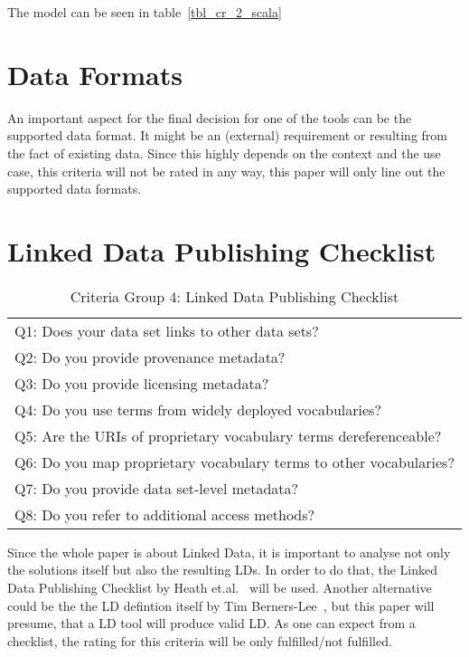 The model can be seen in table~\ref{tbl_cr_2_scala}

\section{Data Formats}

An important aspect for the final decision for one of the tools can be the supported data format. It might be an (external) requirement or resulting from the fact of existing data. Since this highly depends on the context and the use case, this criteria will not be rated in any way, this paper will only line out the supported data formats.

\section{Linked Data Publishing Checklist}

\begin{table}[htb]
\centering
\begin{tabular}{|l|}
\rowcolor[HTML]{EFEFEF} 
\hline
\multicolumn{1}{|c|}{\textbf{Criteria}}                        \\ \hline
Q1: Does your data set links to other data sets?                   \\ \hline
Q2: Do you provide provenance metadata?                            \\ \hline
Q3: Do you provide licensing metadata?                             \\ \hline
Q4: Do you use terms from widely deployed vocabularies?            \\ \hline
Q5: Are the URIs of proprietary vocabulary terms dereferenceable?  \\ \hline
Q6: Do you map proprietary vocabulary terms to other vocabularies? \\ \hline
Q7: Do you provide data set-level metadata?                        \\ \hline
Q8: Do you refer to additional access methods?                     \\ \hline
\end{tabular}
\caption{Criteria Group 4: Linked Data Publishing Checklist}
\label{tbl_cr_4_scala}
\end{table}

Since the whole paper is about Linked Data, it is important to analyse not only the solutions itself but also the resulting LDs. In order to do that, the Linked Data Publishing Checklist by Heath et.al.~\cite{heath2011linked} will be used. Another alternative could be the the LD defintion itself by Tim Berners-Lee~\cite{berners2006linked}, but this paper will presume, that a LD tool will produce valid LD. As one can expect from a checklist, the rating for this criteria will be only fulfilled/not fulfilled.

